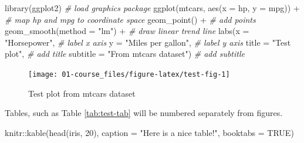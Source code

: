 \documentclass[
]{article}
\newenvironment{Shaded}{\begin{snugshade}}{\end{snugshade}}
\newcommand{\AttributeTok}[1]{\textcolor[rgb]{0.77,0.63,0.00}{#1}}
\newcommand{\CommentTok}[1]{\textcolor[rgb]{0.56,0.35,0.01}{\textit{#1}}}
\newcommand{\ConstantTok}[1]{\textcolor[rgb]{0.00,0.00,0.00}{#1}}
\newcommand{\DecValTok}[1]{\textcolor[rgb]{0.00,0.00,0.81}{#1}}
\newcommand{\FunctionTok}[1]{\textcolor[rgb]{0.00,0.00,0.00}{#1}}
\newcommand{\NormalTok}[1]{#1}
\newcommand{\SpecialCharTok}[1]{\textcolor[rgb]{0.00,0.00,0.00}{#1}}
\newcommand{\StringTok}[1]{\textcolor[rgb]{0.31,0.60,0.02}{#1}}
\begin{document}
\begin{Shaded}
\begin{Highlighting}[]
\FunctionTok{library}\NormalTok{(ggplot2) }\CommentTok{\# load graphics package}
\FunctionTok{ggplot}\NormalTok{(mtcars, }\FunctionTok{aes}\NormalTok{(}\AttributeTok{x =}\NormalTok{ hp, }\AttributeTok{y =}\NormalTok{ mpg)) }\SpecialCharTok{+} \CommentTok{\# map \textquotesingle{}hp\textquotesingle{} and \textquotesingle{}mpg\textquotesingle{} to coordinate space}
  \FunctionTok{geom\_point}\NormalTok{() }\SpecialCharTok{+} \CommentTok{\# add points}
  \FunctionTok{geom\_smooth}\NormalTok{(}\AttributeTok{method =} \StringTok{"lm"}\NormalTok{) }\SpecialCharTok{+} \CommentTok{\# draw linear trend line}
  \FunctionTok{labs}\NormalTok{(}\AttributeTok{x =} \StringTok{"Horsepower"}\NormalTok{, }\CommentTok{\# label x axis}
       \AttributeTok{y =} \StringTok{"Miles per gallon"}\NormalTok{, }\CommentTok{\# label y axis}
       \AttributeTok{title =} \StringTok{"Test plot"}\NormalTok{, }\CommentTok{\# add title}
       \AttributeTok{subtitle =} \StringTok{"From mtcars dataset"}\NormalTok{) }\CommentTok{\# add subtitle}
\end{Highlighting}
\end{Shaded}

\begin{figure}

{\centering \texttt{[image: 01-course\_files/figure-latex/test-fig-1]} 

}

\caption{Test plot from mtcars dataset}\label{fig:test-fig}
\end{figure}

Tables, such as Table \ref{tab:test-tab} will be numbered separately from figures.

\begin{Shaded}
\begin{Highlighting}[]
\NormalTok{knitr}\SpecialCharTok{::}\FunctionTok{kable}\NormalTok{(}\FunctionTok{head}\NormalTok{(iris, }\DecValTok{20}\NormalTok{), }\AttributeTok{caption =} \StringTok{"Here is a nice table!"}\NormalTok{, }\AttributeTok{booktabs =} \ConstantTok{TRUE}\NormalTok{)}
\end{Highlighting}
\end{Shaded}
\end{document}
